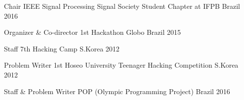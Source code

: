 

\begin{cvhonors}

  \cvhonor
    {Chair} %
    {IEEE Signal Processing Signal Society Student Chapter at IFPB} %
    {Brazil} %
    {2016} %

  \cvhonor
    {Organizer \& Co-director} %
    {1st Hackathon Globo} %
    {Brazil} %
    {2015} %

  \cvhonor
    {Staff} %
    {7th Hacking Camp} %
    {S.Korea} %
    {2012} %

  \cvhonor
    {Problem Writer} %
    {1st Hoseo University Teenager Hacking Competition} %
    {S.Korea} %
    {2012} %

  \cvhonor
    {Staff \& Problem Writer} %
    {POP (Olympic Programming Project)} %
    {Brazil} %
    {2016} %

\end{cvhonors}
